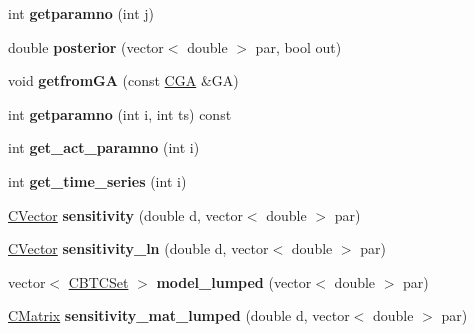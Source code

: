 \begin{DoxyCompactItemize}
\item 
\mbox{\label{class_c_m_c_m_c_a8548915142a5768bbfef48ab4a0eded3}} 
int {\bfseries getparamno} (int j)
\item 
\mbox{\label{class_c_m_c_m_c_ac6a38c0634a9561ebab4bfad327ebb27}} 
double {\bfseries posterior} (vector$<$ double $>$ par, bool out)
\item 
\mbox{\label{class_c_m_c_m_c_a451dcc46fe206fcf1c54b1f623f341cc}} 
void {\bfseries getfrom\+GA} (const \hyperlink{class_c_g_a}{C\+GA} \&GA)
\item 
\mbox{\label{class_c_m_c_m_c_a6ab0c2d792369f9f9a962653e301d3cc}} 
int {\bfseries getparamno} (int i, int ts) const
\item 
\mbox{\label{class_c_m_c_m_c_adaec10cdd523dd3b901d761c734ef07a}} 
int {\bfseries get\+\_\+act\+\_\+paramno} (int i)
\item 
\mbox{\label{class_c_m_c_m_c_a7dbc2bca9eb493124c8dc7f3581034dc}} 
int {\bfseries get\+\_\+time\+\_\+series} (int i)
\item 
\mbox{\label{class_c_m_c_m_c_a674e15f3f352bafdb77df2cf671fcacf}} 
\hyperlink{class_c_vector}{C\+Vector} {\bfseries sensitivity} (double d, vector$<$ double $>$ par)
\item 
\mbox{\label{class_c_m_c_m_c_ae165367701b248ac1883ef28a620b822}} 
\hyperlink{class_c_vector}{C\+Vector} {\bfseries sensitivity\+\_\+ln} (double d, vector$<$ double $>$ par)
\item 
\mbox{\label{class_c_m_c_m_c_a2d7e9c4dcea3872da9526d8dbf468b86}} 
vector$<$ \hyperlink{class_c_b_t_c_set}{C\+B\+T\+C\+Set} $>$ {\bfseries model\+\_\+lumped} (vector$<$ double $>$ par)
\item 
\mbox{\label{class_c_m_c_m_c_acb25411553645e05e771800c247ee7f4}} 
\hyperlink{class_c_matrix}{C\+Matrix} {\bfseries sensitivity\+\_\+mat\+\_\+lumped} (double d, vector$<$ double $>$ par)
\item 
\mbox{\label{class_c_m_c_m_c_af4e6d9e7adfccec1b0bf91bc933d60cb}} 

\end{DoxyCompactItemize}
